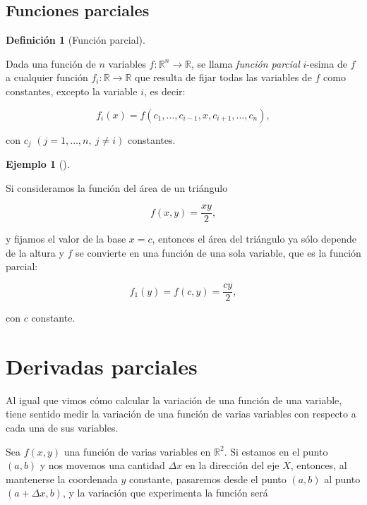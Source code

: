 \documentclass[
  a4paper,
]{scrreport}
\theoremstyle{plain}
\theoremstyle{plain}
\theoremstyle{definition}
\newtheorem{definition}{Definición}[chapter]
\theoremstyle{definition}
\newtheorem{example}{Ejemplo}[chapter]
\theoremstyle{plain}
\theoremstyle{definition}
\theoremstyle{remark}
\begin{document}
\hypertarget{funciones-parciales}{%
\subsection{Funciones parciales}\label{funciones-parciales}}

\begin{definition}[Función
parcial]\protect\hypertarget{def-funcion-parcial}{}\label{def-funcion-parcial}

Dada una función de \(n\) variables
\(f:\mathbb{R}^n\rightarrow \mathbb{R}\), se llama \emph{función
parcial} \(i\)-esima de \(f\) a cualquier función
\(f_i:\mathbb{R}\rightarrow \mathbb{R}\) que resulta de fijar todas las
variables de \(f\) como constantes, excepto la variable \(i\), es decir:

\[f_i(x)=f(c_1,\ldots,c_{i-1},x,c_{i+1},\ldots,c_{n}),\]

con \(c_j\) \((j=1,\ldots, n,\ j\neq i)\) constantes.

\end{definition}

\begin{example}[]\protect\hypertarget{exm-funcion-parcial}{}\label{exm-funcion-parcial}

Si consideramos la función del área de un triángulo

\[f(x,y)=\frac{xy}{2},\]

y fijamos el valor de la base \(x=c\), entonces el área del triángulo ya
sólo depende de la altura y \(f\) se convierte en una función de una
sola variable, que es la función parcial:

\[
f_1(y)=f(c,y)=\frac{cy}{2},
\]

con \(c\) constante.

\end{example}

\hypertarget{derivadas-parciales}{%
\section{Derivadas parciales}\label{derivadas-parciales}}

Al igual que vimos cómo calcular la variación de una función de una
variable, tiene sentido medir la variación de una función de varias
variables con respecto a cada una de sus variables.

Sea \(f(x,y)\) una función de varias variables en \(\mathbb{R}^2\). Si
estamos en el punto \((a,b)\) y nos movemos una cantidad \(\Delta x\) en
la dirección del eje \(X\), entonces, al mantenerse la coordenada \(y\)
constante, pasaremos desde el punto \((a,b)\) al punto
\((a+\Delta x,b)\), y la variación que experimenta la función será
\end{document}
